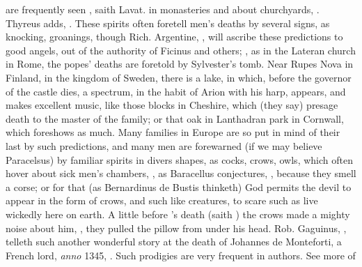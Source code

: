 are frequently seen , saith
Lavat.  in monasteries and about
churchyards, . Thyreus adds, . These spirits often foretell men's deaths by several signs, as
knocking, groanings, \etc{} though Rich. Argentine,
, will ascribe these
predictions to good angels, out of the authority of Ficinus and others;
, as in the Lateran church in
Rome, the popes' deaths are foretold by Sylvester's tomb.
Near Rupes Nova in Finland, in the kingdom of Sweden, there is a lake, in
which, before the governor of the castle dies, a spectrum, in the habit of
Arion with his harp, appears, and makes excellent music, like those blocks in
Cheshire, which (they say) presage death to the master of the family; or that
oak in Lanthadran park in Cornwall, which foreshows as
much. Many families in Europe are so put in mind of their last by such
predictions, and many men are forewarned (if we may believe Paracelsus) by
familiar spirits in divers shapes, as cocks, crows, owls, which often hover
about sick men's chambers, , as
Baracellus conjectures, , because they smell a corse; or for that (as
Bernardinus de Bustis thinketh) God permits the devil to
appear in the form of crows, and such like creatures, to scare such as live
wickedly here on earth. A little before \Tully{}'s death (saith \Plutarch{}) the
crows made a mighty noise about him, , they pulled
the pillow from under his head. Rob. Gaguinus, , telleth such another wonderful story at the death of Johannes
de Monteforti, a French lord, \emph{anno} 1345, . Such prodigies are very frequent in authors. See more of
